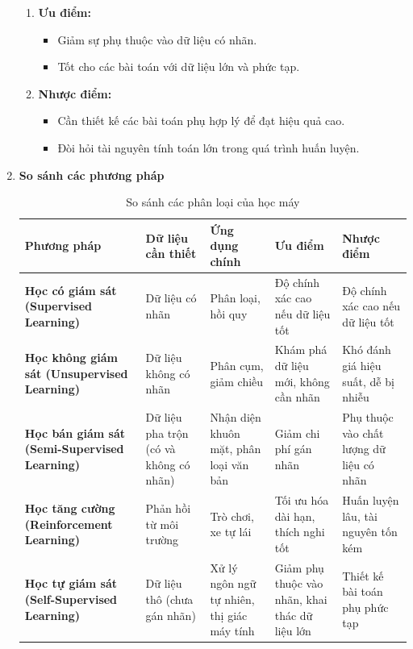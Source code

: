 \documentclass[13pt]{article}
\begin{document}
\begin{enumerate}
\begin{enumerate}
        \item \textbf{Ưu điểm:}
        \begin{itemize}
            \item Giảm sự phụ thuộc vào dữ liệu có nhãn.
            \item Tốt cho các bài toán với dữ liệu lớn và phức tạp.
        \end{itemize}

        \item \textbf{Nhược điểm:}
        \begin{itemize}
            \item Cần thiết kế các bài toán phụ hợp lý để đạt hiệu quả cao.
            \item Đòi hỏi tài nguyên tính toán lớn trong quá trình huấn luyện.
        \end{itemize}
    \end{enumerate}

    \item \textbf{So sánh các phương pháp}

\begin{table}[h!]
\centering
\begin{tabular}{|p{2cm}|p{2.5cm}|p{2.5cm}|p{2.5cm}|p{2.5cm}|}
\hline
\textbf{Phương pháp} & \textbf{Dữ liệu cần thiết} & \textbf{Ứng dụng chính} & \textbf{Ưu điểm} & \textbf{Nhược điểm} \\ 
\hline
\textbf{Học có giám sát (Supervised Learning)} & Dữ liệu có nhãn  & Phân loại, hồi quy & Độ chính xác cao nếu dữ liệu tốt & Độ chính xác cao nếu dữ liệu tốt \\ 
\hline
\textbf{Học không giám sát (Unsupervised Learning)} & Dữ liệu không có nhãn & Phân cụm, giảm chiều & Khám phá dữ liệu mới, không cần nhãn & Khó đánh giá hiệu suất, dễ bị nhiễu\\ 
\hline
\textbf{Học bán giám sát (Semi-Supervised Learning)} & Dữ liệu pha trộn (có và không có nhãn) & Nhận diện khuôn mặt, phân loại văn bản & Giảm chi phí gán nhãn & Phụ thuộc vào chất lượng dữ liệu có nhãn \\ 
\hline
\textbf{Học tăng cường (Reinforcement Learning)} & Phản hồi từ môi trường & Trò chơi, xe tự lái & Tối ưu hóa dài hạn, thích nghi tốt & Huấn luyện lâu, tài nguyên tốn kém \\ 
\hline
\textbf{Học tự giám sát (Self-Supervised Learning)} & Dữ liệu thô (chưa gán nhãn) &Xử lý ngôn ngữ tự nhiên, thị giác máy tính & Giảm phụ thuộc vào nhãn, khai thác dữ liệu lớn & Thiết kế bài toán phụ phức tạp \\ 
\hline
\end{tabular}
\caption{So sánh các phân loại của học máy}
\label{tab:comparison}
\end{table}
    
\end{enumerate}
\end{document}

